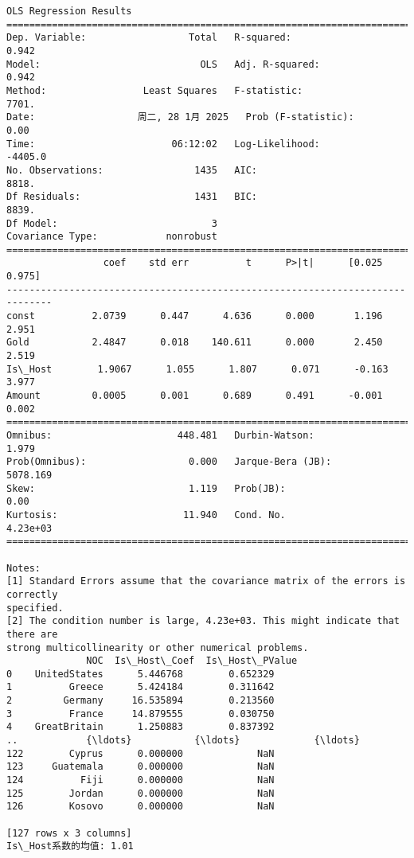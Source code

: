 \documentclass[11pt]{article}
\begin{document}
    \begin{Verbatim}[commandchars=\\\{\}]
                            OLS Regression Results
==============================================================================
Dep. Variable:                  Total   R-squared:                       0.942
Model:                            OLS   Adj. R-squared:                  0.942
Method:                 Least Squares   F-statistic:                     7701.
Date:                  周二, 28 1月 2025   Prob (F-statistic):               0.00
Time:                        06:12:02   Log-Likelihood:                -4405.0
No. Observations:                1435   AIC:                             8818.
Df Residuals:                    1431   BIC:                             8839.
Df Model:                           3
Covariance Type:            nonrobust
==============================================================================
                 coef    std err          t      P>|t|      [0.025      0.975]
------------------------------------------------------------------------------
const          2.0739      0.447      4.636      0.000       1.196       2.951
Gold           2.4847      0.018    140.611      0.000       2.450       2.519
Is\_Host        1.9067      1.055      1.807      0.071      -0.163       3.977
Amount         0.0005      0.001      0.689      0.491      -0.001       0.002
==============================================================================
Omnibus:                      448.481   Durbin-Watson:                   1.979
Prob(Omnibus):                  0.000   Jarque-Bera (JB):             5078.169
Skew:                           1.119   Prob(JB):                         0.00
Kurtosis:                      11.940   Cond. No.                     4.23e+03
==============================================================================

Notes:
[1] Standard Errors assume that the covariance matrix of the errors is correctly
specified.
[2] The condition number is large, 4.23e+03. This might indicate that there are
strong multicollinearity or other numerical problems.
              NOC  Is\_Host\_Coef  Is\_Host\_PValue
0    UnitedStates      5.446768        0.652329
1          Greece      5.424184        0.311642
2         Germany     16.535894        0.213560
3          France     14.879555        0.030750
4    GreatBritain      1.250883        0.837392
..            {\ldots}           {\ldots}             {\ldots}
122        Cyprus      0.000000             NaN
123     Guatemala      0.000000             NaN
124          Fiji      0.000000             NaN
125        Jordan      0.000000             NaN
126        Kosovo      0.000000             NaN

[127 rows x 3 columns]
Is\_Host系数的均值: 1.01
    \end{Verbatim}
\end{document}
